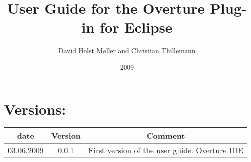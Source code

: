 \documentclass[11pt,a4paper,english,makeidx]{report}
\title{User Guide for the Overture Plug-in for Eclipse}
\author{David Holst M\o ller and Christian Thillemann}
\date{2009}
\makeatletter
\def\maketitle{%
  \null
  \thispagestyle{empty}%
  \vfill
  \begin{center}\leavevmode
    \normalfont
    {\LARGE \@title\par}%
    \vskip 1cm
    {\Large \@author\par}%
    \vskip 1cm
    {\Large \@date\par}%
  \end{center}%
  \vfill
  \null
  \cleardoublepage
  }
\makeatother
\begin{document}
\maketitle


\section*{Versions:}



\begin{tabular}{|c|c|c|}
\hline 
date & Version & Comment\tabularnewline
\hline
\hline 
03.06.2009 & 0.0.1 & First version of the user guide. Overture
IDE\tabularnewline
\hline
\end{tabular}

\newtheorem{fig}{Figure}\newtheorem{tab}{Table}

\setcounter{page}{1} \setcounter{chapter}{0} \setcounter{secnumdepth}{4}
\setcounter{tocdepth}{3}

\pagestyle{myheadings}


\pagestyle{headings}
\tableofcontents

\pagebreak






\end{document}
